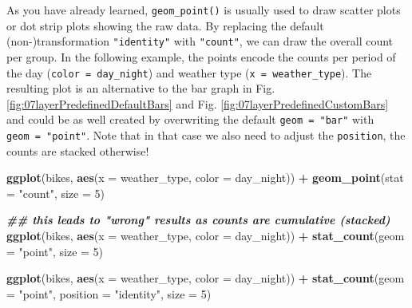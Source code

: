 \documentclass[
]{krantz}
\makeatletter
\newenvironment{Shaded}{\begin{snugshade}}{\end{snugshade}}
\newcommand{\AttributeTok}[1]{\textcolor[rgb]{0.27,0.27,0.27}{#1}}
\newcommand{\DecValTok}[1]{\textcolor[rgb]{0.06,0.06,0.06}{#1}}
\newcommand{\DocumentationTok}[1]{\textcolor[rgb]{0.37,0.37,0.37}{\textbf{\textit{#1}}}}
\newcommand{\FunctionTok}[1]{\textcolor[rgb]{0.27,0.27,0.27}{\textbf{#1}}}
\newcommand{\NormalTok}[1]{#1}
\newcommand{\SpecialCharTok}[1]{\textcolor[rgb]{0.43,0.43,0.43}{\textbf{#1}}}
\newcommand{\StringTok}[1]{\textcolor[rgb]{0.5,0.5,0.5}{#1}}
\newenvironment{kframe}{%
\medskip{}
\setlength{\fboxsep}{.8em}
 \def\at@end@of@kframe{}%
 \ifinner\ifhmode%
  \def\at@end@of@kframe{\end{minipage}}%
  \begin{minipage}{\columnwidth}%
 \fi\fi%
 \def\FrameCommand##1{\hskip\@totalleftmargin \hskip-\fboxsep
 \colorbox{shadecolor}{##1}\hskip-\fboxsep
     \hskip-\linewidth \hskip-\@totalleftmargin \hskip\columnwidth}%
 \MakeFramed {\advance\hsize-\width
   \@totalleftmargin\z@ \linewidth\hsize
   \@setminipage}}%
 {\par\unskip\endMakeFramed%
 \at@end@of@kframe}
\renewenvironment{Shaded}{\begin{kframe}}{\end{kframe}}
\makeatother
\begin{document}
As you have already learned, \texttt{geom\_point()} is usually used to draw scatter plots or dot strip plots showing the raw data. By replacing the default (non-)transformation \texttt{"identity"} with \texttt{"count"}, we can draw the overall count per group. In the following example, the points encode the counts per period of the day (\texttt{color\ =\ day\_night}) and weather type (\texttt{x\ =\ weather\_type}). The resulting plot is an alternative to the bar graph in Fig. \ref{fig:07layerPredefinedDefaultBars} and Fig. \ref{fig:07layerPredefinedCustomBars} and could be as well created by overwriting the default \texttt{geom\ =\ "bar"} with \texttt{geom\ =\ "point"}. Note that in that case we also need to adjust the \texttt{position}, the counts are stacked otherwise!

\begin{Shaded}
\begin{Highlighting}[]
\FunctionTok{ggplot}\NormalTok{(bikes, }\FunctionTok{aes}\NormalTok{(}\AttributeTok{x =}\NormalTok{ weather\_type, }\AttributeTok{color =}\NormalTok{ day\_night)) }\SpecialCharTok{+}
  \FunctionTok{geom\_point}\NormalTok{(}\AttributeTok{stat =} \StringTok{"count"}\NormalTok{, }\AttributeTok{size =} \DecValTok{5}\NormalTok{)}

\DocumentationTok{\#\# this leads to "wrong" results as counts are cumulative (stacked)}
\FunctionTok{ggplot}\NormalTok{(bikes, }\FunctionTok{aes}\NormalTok{(}\AttributeTok{x =}\NormalTok{ weather\_type, }\AttributeTok{color =}\NormalTok{ day\_night)) }\SpecialCharTok{+}
  \FunctionTok{stat\_count}\NormalTok{(}\AttributeTok{geom =} \StringTok{"point"}\NormalTok{, }\AttributeTok{size =} \DecValTok{5}\NormalTok{)}

\FunctionTok{ggplot}\NormalTok{(bikes, }\FunctionTok{aes}\NormalTok{(}\AttributeTok{x =}\NormalTok{ weather\_type, }\AttributeTok{color =}\NormalTok{ day\_night)) }\SpecialCharTok{+}
  \FunctionTok{stat\_count}\NormalTok{(}\AttributeTok{geom =} \StringTok{"point"}\NormalTok{, }\AttributeTok{position =} \StringTok{"identity"}\NormalTok{, }\AttributeTok{size =} \DecValTok{5}\NormalTok{)}
\end{Highlighting}
\end{Shaded}
\end{document}
